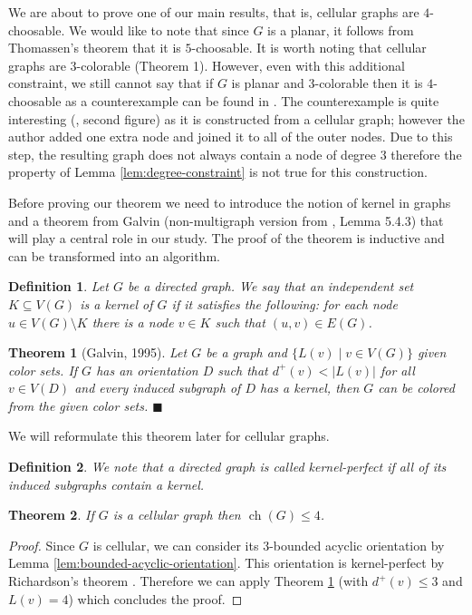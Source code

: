 \documentclass[letterpaper, 10 pt, conference]{ieeeconf}  %
\newtheorem{thm}{Theorem}
\newtheorem{defi}{Definition}
\DeclareMathOperator*{\ch}{ch}
\begin{document}
We are about to prove one of our main results, that is, cellular graphs are $4$-choosable. We would like to note that since $G$ is a planar, it follows from Thomassen's theorem \cite{Thomassen:1994:PG:184180.184192} that it is $5$-choosable. It is worth noting that cellular graphs are $3$-colorable \cite{662943} (Theorem 1). However, even with this additional constraint, we still cannot say that if $G$ is planar and $3$-colorable then it is $4$-choosable as a counterexample can be found in \cite{JGT:JGT4}. The counterexample is quite interesting (\cite {JGT:JGT4}, second figure) as it is constructed from a cellular graph; however the author added one extra node and joined it to all of the outer nodes. Due to this step, the resulting graph does not always contain a node of degree $3$ therefore the property of Lemma \ref{lem:degree-constraint} is not true for this construction.

Before proving our theorem we need to introduce the notion of kernel in graphs and a theorem from Galvin \cite{Galvin:1995:LCI:199352.199369} (non-multigraph version from \cite{citeulike:395714}, Lemma 5.4.3) that will play a central role in our study. The proof of the theorem is inductive and can be transformed into an algorithm.
\begin{defi} Let $G$ be a directed graph. We say that an independent set $K \subseteq V(G)$ is a kernel of $G$ if it satisfies the following: for each node $u \in V(G) \setminus K$ there is a node $v \in K$ such that $(u,v) \in E(G)$.
\end{defi}
\begin{thm}[Galvin, 1995]\label{thm:galvin} Let $G$ be a graph and $\lbrace L(v) \mid v \in V(G) \rbrace$ given color sets. If $G$ has an orientation $D$ such that $d^+(v) < |L(v)|$ for all $v \in V(D)$ and every induced subgraph of $D$ has a kernel, then $G$ can be colored from the given color sets. $\blacksquare$
\end{thm}
We will reformulate this theorem later for cellular graphs. 
\begin{defi} We note that a directed graph is called kernel-perfect if all of its induced subgraphs contain a kernel.
\end{defi}
\begin{thm}\label{thm:choice-number}
If $G$ is a cellular graph then $\ch(G) \leqslant 4$.
\end{thm}
\begin{proof}
Since $G$ is cellular, we can consider its $3$-bounded acyclic orientation by Lemma \ref{lem:bounded-acyclic-orientation}. This orientation is kernel-perfect by Richardson's theorem \cite{richardson1946}. Therefore we can apply Theorem \ref{thm:galvin} (with $d^+(v) \leqslant 3$ and $L(v)=4$) which concludes the proof.
\end{proof}
\end{document}
